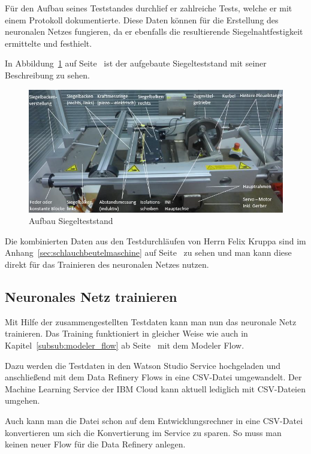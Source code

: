 Für den Aufbau seines Teststandes durchlief er zahlreiche Tests, welche er mit einem Protokoll dokumentierte. Diese
Daten können für die Erstellung des neuronalen Netzes fungieren, da er ebenfalls die resultierende Siegelnahtfestigkeit
ermittelte und festhielt.

In Abbildung~\ref{fig:siegelmaschinen_vffs_simulator} auf Seite~\pageref{fig:siegelmaschinen_vffs_simulator} ist der
aufgebaute Siegelteststand mit seiner Beschreibung zu sehen.

\begin{figure}[h]
    \centering
    \includegraphics[width=\textwidth]{images/kapitel_5/vffs_simulator.png}
    \caption{Aufbau Siegelteststand}
    \label{fig:siegelmaschinen_vffs_simulator}
\end{figure}

Die kombinierten Daten aus den Testdurchläufen von Herrn Felix Kruppa sind im Anhang~\ref{sec:schlauchbeutelmaschine}
auf Seite~\pageref{sec:schlauchbeutelmaschine} zu sehen und man kann diese direkt für das Trainieren des neuronalen
Netzes nutzen.

\subsection{Neuronales Netz trainieren}
Mit Hilfe der zusammengestellten Testdaten kann man nun das neuronale Netz trainieren. Das Training funktioniert in
gleicher Weise wie auch in Kapitel~\ref{subsub:modeler_flow} ab Seite~\pageref{subsub:modeler_flow} mit dem Modeler
Flow.

Dazu werden die Testdaten in den Watson Studio Service hochgeladen und anschließend mit dem Data Refinery Flows in eine
CSV-Datei umgewandelt. Der Machine Learning Service der IBM Cloud kann aktuell lediglich mit CSV-Dateien umgehen.

Auch kann man die Datei schon auf dem Entwicklungsrechner in eine CSV-Datei konvertieren um sich die Konvertierung im
Service zu sparen. So muss man keinen neuer Flow für die Data Refinery anlegen.

